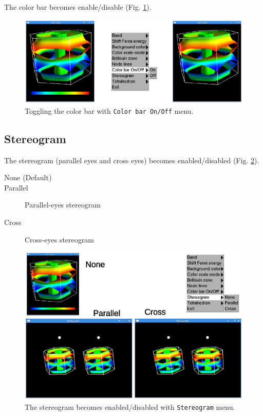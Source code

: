 \documentclass[12pt]{article}
\begin{document}
The color bar becomes enable/disable (Fig. \ref{fig_colorbar}). 

\begin{figure}[!ht]
  \includegraphics[width=17cm]{figs/colorbar.eps}
  \caption{Toggling the color bar with \texttt{Color bar On/Off} menu.}
  \label{fig_colorbar}
\end{figure}

\subsection{Stereogram}

The stereogram (parallel eyes and  cross eyes) becomes 
enabled/disabled (Fig. \ref{fig_stereogram}).
\begin{description}
\item[None (Default)]   
\item[Parallel] Parallel-eyes stereogram 
\item[Cross] Cross-eyes stereogram 
\end{description}

\begin{figure}[!ht]
  \includegraphics[width=17cm]{figs/stereogram.eps}
  \caption{The stereogram becomes enabled/disabled with \texttt{Stereogram} menu.}
  \label{fig_stereogram}
\end{figure}
\end{document}

